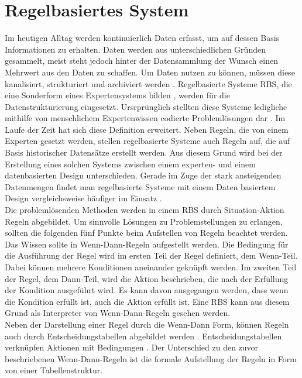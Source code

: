 \section{Regelbasiertes System} 
Im heutigen Alltag werden kontinuierlich Daten erfasst, um auf dessen Basis Informationen zu erhalten. Daten werden aus unterschiedlichen Gründen gesammelt, meist steht jedoch hinter der Datensammlung der Wunsch einen Mehrwert aus den Daten zu schaffen. Um Daten nutzen zu können, müssen diese kanalisiert, strukturiert und archiviert werden \cite{managermagazin:datensammlung}. Regelbasierte Systeme \acs{RBS}, die eine Sonderform eines Expertensystems bilden \cite{ieee:ruleBasedSystemAndNetworks}, werden für die Datenstrukturierung eingesetzt. Ursrprünglich stellten diese Systeme ledigliche mithilfe von menschlichem Expertenwissen codierte Problemlösungen dar \cite{Hayes-Roth:1985:RS:4284.4286}. Im Laufe der Zeit hat sich diese Definition erweitert. Neben Regeln, die von einem Experten gesetzt werden, stellen regelbasierte Systeme auch Regeln auf, die auf Basis historischer Datensätze erstellt werden. Aus diesem Grund wird bei der Erstellung eines solchen Systems zwischen einem experten- und einem datenbasierten Design unterschieden. Gerade im Zuge der stark ansteigenden Datenmengen findet man regelbasierte Systeme mit einem Daten basiertem Design vergleichsweise häufiger im Einsatz \cite{ieee:ruleBasedSystemAndNetworks}.\\
Die problemlösenden Methoden werden in einem \ac{RBS} durch Situation-Aktion Regeln abgebildet. Um sinnvolle Lösungen zu Problemstellungen zu erlangen, sollten die folgenden fünf Punkte beim Aufstellen von Regeln beachtet werden.\\
Das Wissen sollte in Wenn-Dann-Regeln aufgestellt werden. Die Bedingung für die Ausführung der Regel wird im ersten Teil der Regel definiert, dem Wenn-Teil. Dabei können mehrere Konditionen aneinander geknüpft werden. Im zweiten Teil der Regel, dem Dann-Teil, wird die Aktion beschrieben, die nach der Erfüllung der Kondition ausgeführt wird. Es kann davon ausgegangen werden, dass wenn die Kondition erfüllt ist, auch die Aktion erfüllt ist. Eine \ac{RBS} kann aus diesem Grund als Interpreter von Wenn-Dann-Regeln gesehen werden\cite{oracle:JREAPI}.\\
Neben der Darstellung einer Regel durch die Wenn-Dann Form, können Regeln auch durch Entscheidungstabellen abgebildet werden \cite{HSAugsburg:RuleEngine}. Entscheidungstabellen verknüpfen Aktionen mit Bedingungen \cite{itwissen:entscheidungstabelle}. Der Unterschied zu den zuvor beschriebenen Wenn-Dann-Regeln ist die formale Aufstellung der Regeln in Form von einer Tabellenstruktur.\\

